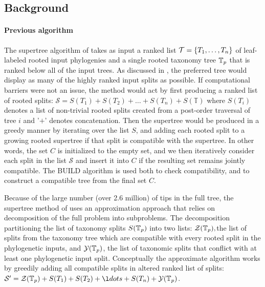 \documentclass[english]{article}
\begin{document}
\subsection{Background}

\paragraph{Previous algorithm}

The supertree algorithm of \citet{redelings2017supertree} takes as
input a ranked list $\mathcal{T}=\left\{ T_{1},\ldots,T_{n}\right\} $
of leaf-labeled rooted input phylogenies and a single rooted taxonomy
tree $\mbox{\ensuremath{\mathbb{T}}}_{p}$ that is ranked below all of the input trees. As
discussed in \citet{redelings2017supertree}, the preferred tree would
display as many of the highly ranked input splits as possible. If
computational barriers were not an issue, the method would act by
first producing a ranked list of rooted splits:
$\mathcal{S}=S(T_{1})+S(T_{2})+\ldots+S(T_{n})+S(\mathbb{T})$ where
$S(T_{i})$ denotes a list of non-trivial rooted splits created from a
post-order traversal of tree $i$ and '$+$' denotes concatenation. Then
the supertree would be produced in a greedy manner by iterating over
the list $S$, and adding each rooted split to a growing rooted
supertree if that split is compatible with the supertree. In other
words, the set $C$ is initialized to the empty set, and we then
iteratively consider each split in the list $\mathcal{S}$ and insert
it into $C$ if the resulting set remains jointly compatible. The BUILD
algorithm\citep{AhoSSU1981} is used both to check compatibility, and
to construct a compatible tree from the final set $C$.

Because of the large number (over 2.6 million) of tips in the full
tree, the supertree method of \citet{redelings2017supertree} uses an
approximation approach that relies on decomposition of the full
problem into subproblems. The decomposition partitioning the list of
taxonomy splits $S(\mbox{\ensuremath{\mathbb{T}}}_{p})$ into two lists:
$\mathcal{Z}(\mbox{\ensuremath{\mathbb{T}}}_{p}),$the list of splits from the taxonomy tree
which are compatible with every rooted split in the phylogenetic
inputs, and $\mathcal{Y}(\mbox{\ensuremath{\mathbb{T}}}_{p})$, the list of taxonomic splits
that conflict with at least one phylogenetic input split. Conceptually
the approximate algorithm works by greedily adding all compatible
splits in altered ranked list of splits:
$\mathcal{S}^{\prime}=\mathcal{Z}(\taxonomy_{p})+S(T_{1})+S(T_{2})+\l
dots+S(T_{n})+\mathcal{Y}(\taxonomy_{p})$.
\end{document}
